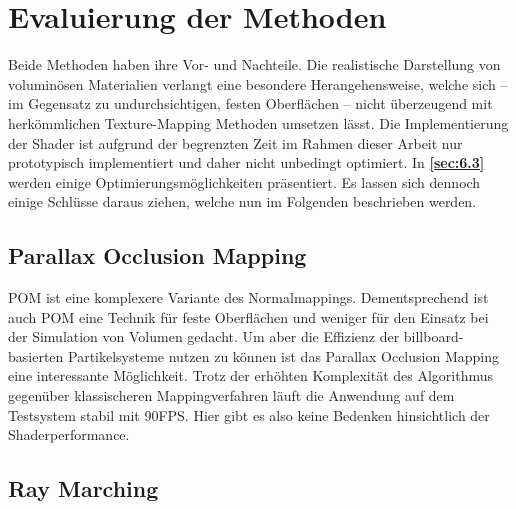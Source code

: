 \section{Evaluierung der Methoden}
\label{sec:5}

Beide Methoden haben ihre Vor- und Nachteile. Die realistische Darstellung von voluminösen Materialien verlangt 
eine besondere Herangehensweise, welche sich – im Gegensatz zu undurchsichtigen, festen Oberflächen – 
nicht überzeugend mit herkömmlichen Texture-Mapping Methoden umsetzen lässt. 
Die Implementierung der Shader ist aufgrund der 
begrenzten Zeit im Rahmen dieser Arbeit nur prototypisch implementiert und daher nicht unbedingt optimiert. 
In \textbf{\autoref{sec:6.3} } werden einige Optimierungsmöglichkeiten präsentiert. 
Es lassen sich dennoch einige Schlüsse daraus ziehen, welche nun im Folgenden beschrieben werden. 


\subsection{Parallax Occlusion Mapping}
POM ist eine komplexere Variante des Normalmappings. Dementsprechend ist auch POM eine Technik für feste Oberflächen und weniger
für den Einsatz bei der Simulation von Volumen gedacht. Um aber die Effizienz der billboard-basierten Partikelsysteme 
nutzen zu können ist das Parallax Occlusion Mapping eine interessante Möglichkeit. Trotz der erhöhten Komplexität des Algorithmus
gegenüber klassischeren Mappingverfahren läuft die Anwendung auf dem Testsystem stabil mit 90FPS. Hier gibt es also keine 
Bedenken hinsichtlich der Shaderperformance. 

\subsection{Ray Marching}
